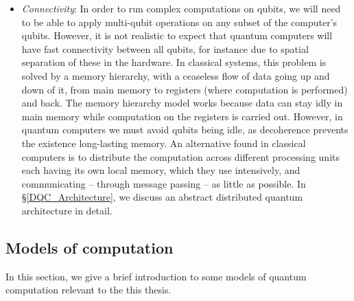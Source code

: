 \begin{itemize}
  \item \textit{Connectivity}: In order to run complex computations on qubits, we will need to be able to apply multi-qubit operations on any subset of the computer's qubits. However, it is not realistic to expect that quantum computers will have fast connectivity between all qubits, for instance due to spatial separation of these in the hardware. In classical systems, this problem is solved by a memory hierarchy, with a ceaseless flow of data going up and down of it, from main memory to registers (where computation is performed) and back. The memory hierarchy model works because data can stay idly in main memory while computation on the registers is carried out. However, in quantum computers we must avoid qubits being idle, as decoherence prevents the existence long-lasting memory. An alternative found in classical computers is to distribute the computation across different processing units each having its own local memory, which they use intensively, and communicating -- through message passing -- as little as possible. In \S\ref{DQC_Architecture}, we discuss an abstract distributed quantum architecture in detail.

\end{itemize}


\subsection{Models of computation}
\label{Models}

In this section, we give a brief introduction to some models of quantum computation relevant to the this thesis.


